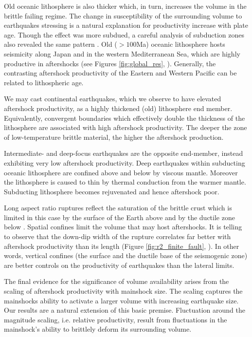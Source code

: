 \documentclass[draft, jgrga]{agujournal2018}
\begin{document}
Old oceanic lithosphere is also thicker which, in turn, increases the volume in the brittle failing regime. The change in susceptibility of the surrounding volume to earthquakes stressing is a natural explanation for productivity increase with plate age. Though the effect was more subdued, a careful analysis of subduction zones also revealed the same pattern \citep[Appendix of][]{Wetzler2016}. Old ($>100$Ma) oceanic lithosphere hosts seismicity along Japan and in the western Mediterranean Sea, which are highly productive in aftershocks (see Figures \ref{fig:global_res}, ). Generally, the contrasting aftershock productivity of the Eastern and Western Pacific can be related to lithospheric age. 

We may cast continental earthquakes, which we observe to have elevated aftershock productivity, as a highly thickened (old) lithosphere end member. Equivalently, convergent boundaries which effectively double the thickness of the lithosphere are associated with high aftershock productivity. The deeper the zone of low-temperature brittle material, the higher the aftershock production.

Intermediate- and deep-focus earthquakes are the opposite end-member, instead exhibiting very low aftershock productivity. Deep earthquakes within subducting oceanic lithosphere are confined above and below by viscous mantle. Moreover the lithosphere is caused to thin by thermal conduction from the warmer mantle. Subducting lithosphere becomes rejuvenated and hence aftershock poor.

Long aspect ratio ruptures reflect the saturation of the brittle crust which is limited in this case by the surface of the Earth above and by the ductile zone below \citep{Scholz2019}. Spatial confines limit the volume that may host aftershocks. It is telling to observe that the down-dip width of the rupture correlates far better with aftershock productivity than its length (Figure \ref{fig:r2_finite_fault}, ). In other words, vertical confines (the surface and the ductile base of the seismogenic zone) are better controls on the productivity of earthquakes than the lateral limits. 

The final evidence for the significance of volume availability arises from the scaling of aftershock productivity with mainshock size. The scaling captures the mainshocks ability to activate a larger volume with increasing earthquake size. Our results are a natural extension of this basic premise. Fluctuation around the magnitude scaling, i.e. relative productivity, result from fluctuations in the mainshock's ability to brittlely deform its surrounding volume. 
\end{document}
